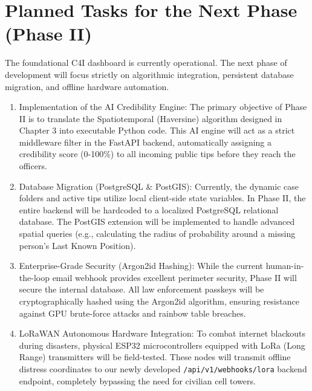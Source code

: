 \documentclass[12pt,a4paper]{report}
\begin{document}
\section{Planned Tasks for the Next Phase (Phase II)}
The foundational C4I dashboard is currently operational. The next phase of development will focus strictly on algorithmic integration, persistent database migration, and offline hardware automation.
\begin{enumerate}
    \item Implementation of the AI Credibility Engine: The primary objective of Phase II is to translate the Spatiotemporal (Haversine) algorithm designed in Chapter 3 into executable Python code. This AI engine will act as a strict middleware filter in the FastAPI backend, automatically assigning a credibility score (0-100\%) to all incoming public tips before they reach the officers.
    \item Database Migration (PostgreSQL \& PostGIS): Currently, the dynamic case folders and active tips utilize local client-side state variables. In Phase II, the entire backend will be hardcoded to a localized PostgreSQL relational database. The PostGIS extension will be implemented to handle advanced spatial queries (e.g., calculating the radius of probability around a missing person's Last Known Position).
    \item Enterprise-Grade Security (Argon2id Hashing): While the current human-in-the-loop email webhook provides excellent perimeter security, Phase II will secure the internal database. All law enforcement passkeys will be cryptographically hashed using the Argon2id algorithm, ensuring resistance against GPU brute-force attacks and rainbow table breaches.
    \item LoRaWAN Autonomous Hardware Integration: To combat internet blackouts during disasters, physical ESP32 microcontrollers equipped with LoRa (Long Range) transmitters will be field-tested. These nodes will transmit offline distress coordinates to our newly developed \texttt{/api/v1/webhooks/lora} backend endpoint, completely bypassing the need for civilian cell towers.
\end{enumerate}
\end{document}

